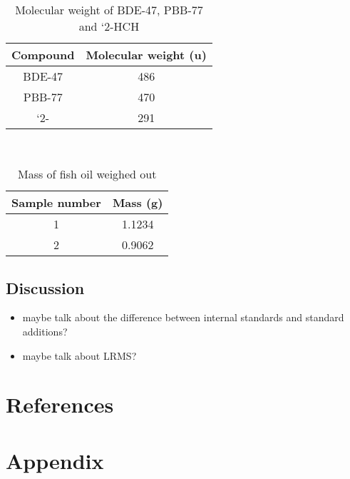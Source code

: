 \documentclass[a4paper, 12pt]{article}
\begin{document}
\begin{table}[h!]
	\centering
	\caption{Molecular weight of BDE-47, PBB-77 and `2-HCH}
	\hfill \\
	\begin{tabular}{|c|c|}
		\hline
		Compound & Molecular weight (\si{\amu}) \\
		\hline
		BDE-47 & 486 \\
		\hline
		PBB-77 & 470 \\
		\hline
		`2-\ce{HCH} & 291 \\
		\hline
	\end{tabular}
	\label{tab-mass}
\end{table}

\begin{table}[h!]
	\centering
	\caption{Mass of fish oil weighed out}
	\hfill \\
	\begin{tabular}{|c|c|}
		\hline
		Sample number & Mass (\si{\gram}) \\
		\hline
		1 & 1.1234 \\
		\hline
		2 & 0.9062 \\
		\hline
	\end{tabular}
	\label{tab-fish}
\end{table}


\subsection{Discussion}
\begin{itemize}
	\item maybe talk about the difference between internal standards and standard additions?
	\item maybe talk about LRMS?
\end{itemize}


\section{References}
\printbibliography


\section{Appendix}
\end{document}
